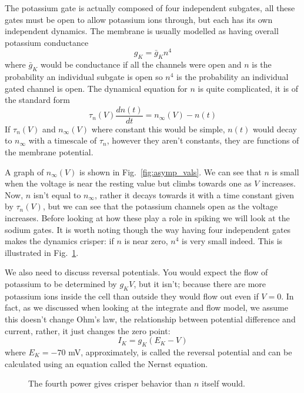 \documentclass[11pt,a4paper]{scrartcl}
\begin{document}
The potassium gate is actually composed of four independent subgates,
all these gates must be open to allow potassium ions through, but each
has its own independent dynamics. The membrane is usually modelled as
having overall potassium conductance
\begin{equation}
g_{K}=\bar{g}_Kn^4
\end{equation}
where $\bar{g}_K$ would be conductance if all the channels were open
and $n$ is the probability an individual subgate is open so $n^4$ is
the probability an individual gated channel is open. The dynamical equation for $n$ is quite complicated, it is of the standard form
\begin{equation}
\tau_n(V)\frac{dn(t)}{dt}=n_\infty(V)-n(t)
\end{equation}
If $\tau_n(V)$ and $n_\infty(V)$ where constant this would be simple,
$n(t)$ would decay to $n_\infty$ with a timescale of $\tau_n$, however
they aren't constants, they are functions of the membrane potential. 

A graph of $n_\infty(V)$ is shown in Fig.~\ref{fig:asymp_vals}. We can
see that $n$ is small when the voltage is near the resting value but
climbs towards one as $V$ increases. Now, $n$ isn't equal to
$n_\infty$, rather it decays towards it with a time constant given by
$\tau_n(V)$, but we can see that the potassium channels open as the
voltage increases. Before looking at how these play a role in spiking
we will look at the sodium gates. It is worth noting though the way
having four independent gates makes the dynamics crisper: if $n$ is
near zero, $n^4$ is very small indeed. This is illustrated in
Fig.~\ref{fig:nfour}.

We also need to discuss reversal potentials. You would expect the flow
of potassium to be determined by $g_KV$, but it isn't; because there
are more potassium ions inside the cell than outside they would flow
out even if $V=0$. In fact, as we discussed when looking at the
integrate and flow model, we assume this doesn't change Ohm's law, the
relationship between potential difference and current, rather, it just
changes the zero point:
\begin{equation}
I_K=g_K(E_K-V)
\end{equation}
where $E_K=-70$ mV, approximately, is called the reversal potential
and can be calculated using an equation called the Nernst equation.

\begin{figure}
\begin{center}

\end{center}
\caption{The fourth power gives crisper behavior than $n$ itself would.\label{fig:nfour}}
\end{figure}
\end{document}
